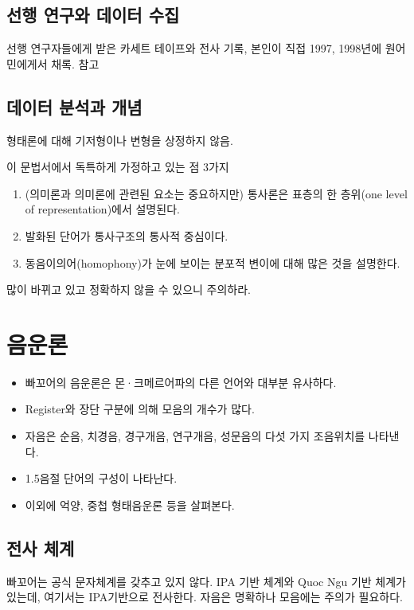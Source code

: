 \subsection{선행 연구와 데이터 수집}
선행 연구자들에게 받은 카세트 테이프와 전사 기록, 본인이 직접 1997, 1998년에 원어민에게서 채록.
참고

\subsection{데이터 분석과 개념}
형태론에 대해 기저형이나 변형을 상정하지 않음.


이 문법서에서 독특하게 가정하고 있는 점 3가지
\begin{enumerate}
\item (의미론과 의미론에 관련된 요소는 중요하지만) 통사론은 표층의 한 층위(one level of representation)에서 설명된다.
\item 발화된 단어가 통사구조의 통사적 중심이다.
\item 동음이의어(homophony)가 눈에 보이는 분포적 변이에 대해 많은 것을 설명한다.
\end{enumerate}

많이 바뀌고 있고 정확하지 않을 수 있으니 주의하라.

\section{음운론}
\begin{itemize} 
\item 빠꼬어의 음운론은 몬·크메르어파의 다른 언어와 대부분 유사하다.
\item Register와 장단 구분에 의해 모음의 개수가 많다. 
\item 자음은 순음, 치경음, 경구개음, 연구개음, 성문음의 다섯 가지 조음위치를 나타낸다. 
\item 1.5음절 단어의 구성이 나타난다. 
\item 이외에 억양, 중첩 형태음운론 등을 살펴본다. 
\end{itemize}
\subsection{전사 체계}
빠꼬어는 공식 문자체계를 갖추고 있지 않다. IPA 기반 체계와 Quoc Ngu 기반 체계가 있는데, 여기서는 IPA기반으로 전사한다. 자음은 명확하나 모음에는 주의가 필요하다.
